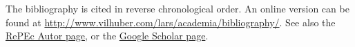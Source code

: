 \documentclass[10pt,letterpaper]{article}
\author{Lars Vilhuber}
\date{\today}
\title{\mytitle}
\newcommand{\mytitle}{Bibliography}
\begin{document}
\maketitle
The bibliography is cited in reverse chronological order.  An online version can be found at 
\newline
\url{http://www.vilhuber.com/lars/academia/bibliography/}.
%
See also the \href{http://authors.repec.org/pro/pvi26/}{RePEc Autor page}, or the 
\href{http://scholar.google.ca/citations?user=9niHU-cAAAAJ&hl=en}{Google 
Scholar page}.
\nocite{*}

\printbibliography
%
%
%
\end{document}
